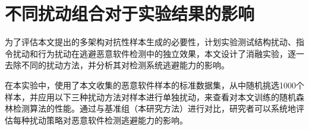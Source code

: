 
\section{不同扰动组合对于实验结果的影响}

为了评估本文提出的多架构对抗性样本生成的必要性，计划实验测试结构扰动、指令扰动和行为扰动在逃避恶意软件检测中的独立效果，本文设计了消融实验，逐一去除不同的扰动方法，并分析其对检测系统逃避能力的影响。


在本实验中，使用了本文收集的恶意软件样本的标准数据集，从中随机挑选1000个样本，并应用以下三种扰动方法对样本进行单独扰动，来查看对本文训练的随机森林检测算法的性能。通过与基准组（本研究方法）进行对比，研究者可以系统地评估每种扰动策略对恶意软件检测逃避能力的影响。


